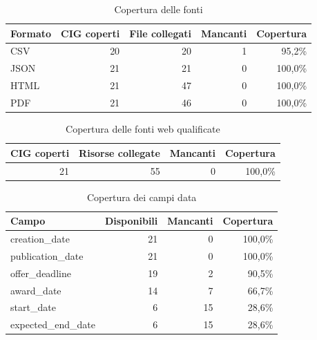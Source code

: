 \begin{table}[htbp]
\centering
\caption{Copertura delle fonti}
\begin{tabular}{lrrrr}
\toprule
Formato & CIG coperti & File collegati & Mancanti & Copertura \\
\midrule
CSV & 20 & 20 & 1 & 95,2\% \\
JSON & 21 & 21 & 0 & 100,0\% \\
HTML & 21 & 47 & 0 & 100,0\% \\
PDF & 21 & 46 & 0 & 100,0\% \\
\bottomrule
\end{tabular}
\end{table}

\begin{table}[htbp]
\centering
\caption{Copertura delle fonti web qualificate}
\begin{tabular}{rrrr}
\toprule
CIG coperti & Risorse collegate & Mancanti & Copertura \\
\midrule
21 & 55 & 0 & 100,0\% \\
\bottomrule
\end{tabular}
\end{table}

\begin{table}[htbp]
\centering
\small
\caption{Copertura dei campi data}
\begin{tabular}{lrrr}
\toprule
Campo & Disponibili & Mancanti & Copertura \\
\midrule
creation\_date & 21 & 0 & 100,0\% \\
publication\_date & 21 & 0 & 100,0\% \\
offer\_deadline & 19 & 2 & 90,5\% \\
award\_date & 14 & 7 & 66,7\% \\
start\_date & 6 & 15 & 28,6\% \\
expected\_end\_date & 6 & 15 & 28,6\% \\
\bottomrule
\end{tabular}
\end{table}
